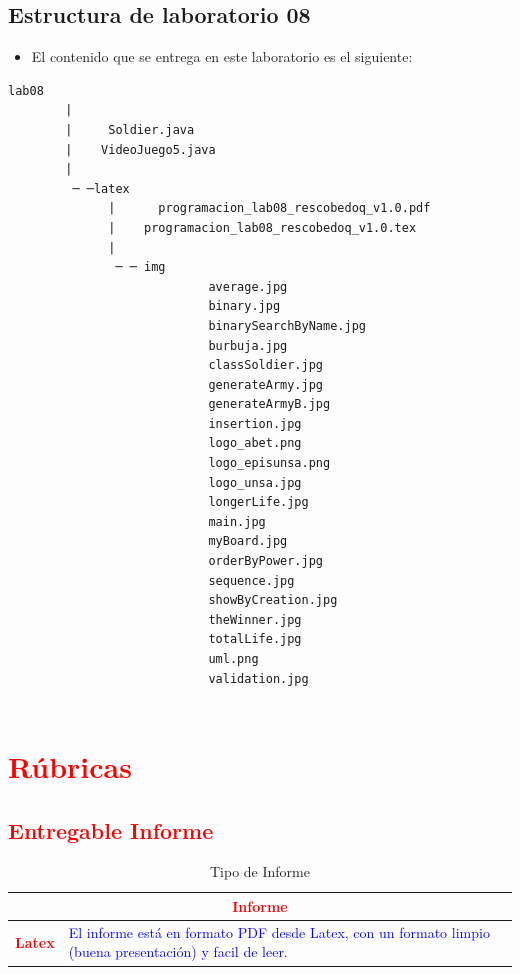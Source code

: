 \documentclass{article}
\begin{document}
	\subsection{Estructura de laboratorio 08}
	\begin{itemize}	
		\item El contenido que se entrega en este laboratorio es el siguiente:
	\end{itemize}
	
	\begin{lstlisting}[style=ascii-tree]
		lab08
		|   
		|	  Soldier.java
		|    VideoJuego5.java
		|
		 ─ ─latex
			  |  	 programacion_lab08_rescobedoq_v1.0.pdf
			  |    programacion_lab08_rescobedoq_v1.0.tex
			  |
			   ─ ─ img
							average.jpg
							binary.jpg
							binarySearchByName.jpg
							burbuja.jpg
							classSoldier.jpg
							generateArmy.jpg
							generateArmyB.jpg
							insertion.jpg
							logo_abet.png
							logo_episunsa.png
							logo_unsa.jpg
							longerLife.jpg
							main.jpg
							myBoard.jpg
							orderByPower.jpg
							sequence.jpg
							showByCreation.jpg
							theWinner.jpg
							totalLife.jpg
							uml.png
							validation.jpg
			
	\end{lstlisting}    
	
	\section{\textcolor{red}{Rúbricas}}
	
	\subsection{\textcolor{red}{Entregable Informe}}
	\begin{table}[H]
		\caption{Tipo de Informe}
		\setlength{\tabcolsep}{0.5em} %
		{\renewcommand{\arraystretch}{1.5}%
			\begin{tabular}{|p{3cm}|p{12cm}|}
				\hline
				\multicolumn{2}{|c|}{\textbf{\textcolor{red}{Informe}}}  \\
				\hline 
				\textbf{\textcolor{red}{Latex}} & \textcolor{blue}{El informe está en formato PDF desde Latex,  con un formato limpio (buena presentación) y facil de leer.}   \\ 
				\hline 
				
				
			\end{tabular}
		}
	\end{table}
	
\end{document}
